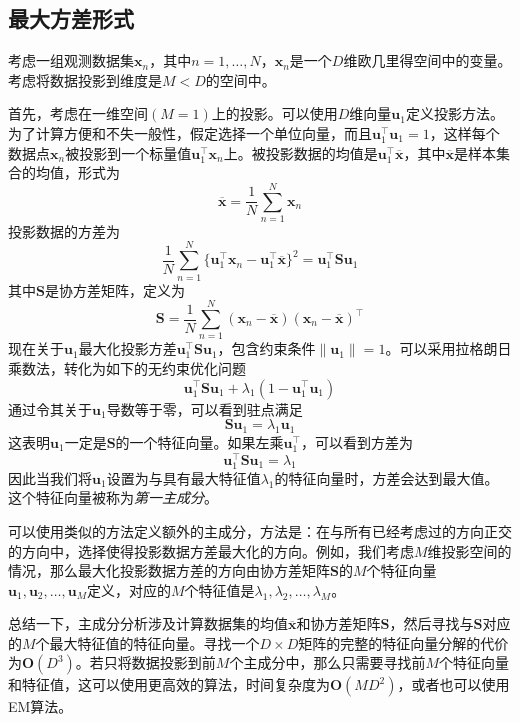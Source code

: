 \documentclass[11pt]{ctexbook}
\begin{document}
\subsection{最大方差形式}
考虑一组观测数据集${\bm x_n}$，其中$n=1,\ldots,N$，$\bm x_n$是一个$D$维欧几里得空间中的变量。考虑将数据投影到维度是$M<D$的空间中。

首先，考虑在一维空间$(M=1)$上的投影。可以使用$D$维向量$\bm u_1$定义投影方法。为了计算方便和不失一般性，假定选择一个单位向量，而且$\bm u_1^{\top}\bm u_1 = 1$，这样每个数据点$\bm x_n$被投影到一个标量值$\bm u_1^{\top}\bm x_n$上。被投影数据的均值是$\bm u_1^{\top}\overline{\bm x}$，其中$
\overline{\bm x}$是样本集合的均值，形式为
\begin{equation}
	\overline{\bm x} = \frac{1}{N}\sum_{n=1}^{N}\bm x_n
\end{equation}
投影数据的方差为
\begin{equation}
	\frac{1}{N}\sum_{n=1}^{N}\{\bm u_1^{\top}\bm x_n - \bm u_1^{\top}\overline{\bm x}\}^2 = \bm u_1^\top\bm S\bm u_1
\end{equation}
其中$\bm S$是协方差矩阵，定义为
\begin{equation}
	\bm S = \frac{1}{N}\sum_{n=1}^{N}(\bm x_n - \overline{\bm x})(\bm x_n - \overline{\bm x})^\top
\end{equation}
现在关于$\bm u_1$最大化投影方差$\bm u_1^\top\bm S\bm u_1$，包含约束条件$\|\bm u_1\| = 1$。可以采用拉格朗日乘数法，转化为如下的无约束优化问题
\begin{equation}
	\bm u_1^\top \bm S\bm u_1 + \lambda_1(1-\bm u_1^\top\bm u_1)
\end{equation}
通过令其关于$\bm u_1$导数等于零，可以看到驻点满足
\begin{equation}
	\bm S\bm u_1 = \lambda_1\bm u_1
\end{equation}
这表明$\bm u_1$一定是$\bm S$的一个特征向量。如果左乘$\bm u_1^\top$，可以看到方差为
\begin{equation}
	\bm u_1^\top \bm S\bm u_1 = \lambda_1
\end{equation}
因此当我们将$\bm u_1$设置为与具有最大特征值$\lambda_1$的特征向量时，方差会达到最大值。这个特征向量被称为\emph{第一主成分}。

可以使用类似的方法定义额外的主成分，方法是：在与所有已经考虑过的方向正交的方向中，选择使得投影数据方差最大化的方向。例如，我们考虑$M$维投影空间的情况，那么最大化投影数据方差的方向由协方差矩阵$\bm S$的$M$个特征向量$\bm u_1, \bm u_2, \ldots, \bm u_M$定义，对应的$M$个特征值是$\lambda_1, \lambda_2, \ldots, \lambda_M$。

总结一下，主成分分析涉及计算数据集的均值$\overline{\bm x}$和协方差矩阵$\bm S$，然后寻找与$\bm S$对应的$M$个最大特征值的特征向量。寻找一个$D\times D$矩阵的完整的特征向量分解的代价为$\bm O(D^3)$。若只将数据投影到前$M$个主成分中，那么只需要寻找前$M$个特征向量和特征值，这可以使用更高效的算法，时间复杂度为$\bm O(MD^2)$，或者也可以使用EM算法。
\end{document}
